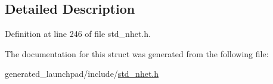 \subsection{Detailed Description}


Definition at line 246 of file std\+\_\+nhet.\+h.



The documentation for this struct was generated from the following file\+:\begin{DoxyCompactItemize}
\item 
generated\+\_\+launchpad/include/\mbox{\hyperlink{std__nhet_8h}{std\+\_\+nhet.\+h}}\end{DoxyCompactItemize}
